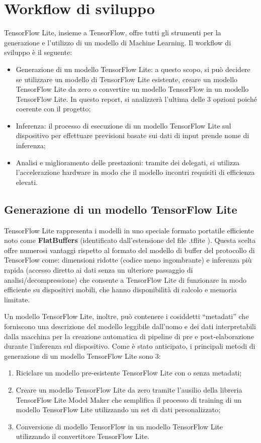 \section{Workflow di sviluppo}
TensorFlow Lite, insieme a TensorFlow, offre tutti gli strumenti per la generazione e l’utilizzo di un modello di Machine Learning. Il workflow di
sviluppo è il seguente:
\begin{itemize}
    \item Generazione di un modello TensorFlow Lite: a questo scopo, si può decidere se utilizzare un modello di TensorFlow Lite esistente, creare un
    modello TensorFlow Lite da zero o convertire un modello TensorFlow in un modello TensorFlow Lite. In questo report, si analizzerà l’ultima delle 3
    opzioni poiché coerente con il progetto;
    \item Inferenza: il processo di esecuzione di un modello TensorFlow Lite sul dispositivo per effettuare previsioni basate sui dati di input prende
    nome di inferenza;
    \item Analisi e miglioramento delle prestazioni: tramite dei delegati, si utilizza l’accelerazione hardware in modo che il modello incontri requisiti
    di efficienza elevati.
\end{itemize}

\subsection{Generazione di un modello TensorFlow Lite}
TensorFlow Lite rappresenta i modelli in uno speciale formato portatile efficiente noto come \textbf{FlatBuffers} (identificato dall'estensione del file .tflite ).
Questa scelta offre numerosi vantaggi rispetto al formato del modello di buffer del protocollo di TensorFlow come: dimensioni ridotte
(codice meno ingombrante) e inferenza più rapida (accesso diretto ai dati senza un ulteriore passaggio di analisi/decompressione) che consente a TensorFlow
Lite di funzionare in modo efficiente su dispositivi mobili, che hanno disponibilità di calcolo e memoria limitate.

Un modello TensorFlow Lite, inoltre, può contenere i cosiddetti “metadati” che forniscono una descrizione del modello leggibile dall’uomo e dei dati
interpretabili dalla macchina per la creazione automatica di pipeline di pre e post-elaborazione durante l’inferenza sul dispositivo.
Come è stato anticipato, i principali metodi di generazione di un modello TensorFlow Lite sono 3: 
\begin{enumerate}
    \item Riciclare un modello pre-esistente TensorFlow Lite con o senza metadati;
    \item Creare un modello TensorFlow Lite da zero tramite l’ausilio della libreria TensorFlow Lite Model Maker che semplifica il processo di training di
    un modello TensorFlow Lite utilizzando un set di dati personalizzato;
    \item Conversione di modello TensorFlow in un modello TensorFlow Lite utilizzando il convertitore TensorFlow Lite.
\end{enumerate}

